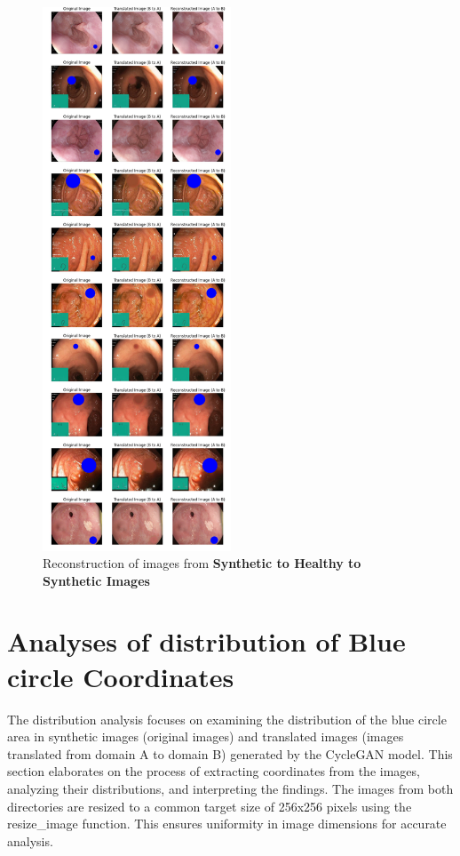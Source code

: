 \documentclass[UKenglish,12pt]{master-style}
\begin{document}
\begin{figure}[htbp]
    \centering
    \includegraphics[width=0.5\textwidth]{Images/B-A-B.jpeg}
    \caption{Reconstruction of images from \textbf{Synthetic to Healthy to Synthetic Images}}
    \label{fig:B-A-B}
\end{figure}

\section{Analyses of distribution of Blue circle Coordinates}

The distribution analysis focuses on examining the distribution of the blue circle area in synthetic images (original images) and translated images (images translated from domain A to domain B) generated by the CycleGAN model. This section elaborates on the process of extracting coordinates from the images, analyzing their distributions, and interpreting the findings. The images from both directories are resized to a common target size of 256x256 pixels using the resize\_image function. This ensures uniformity in image dimensions for accurate analysis.
\end{document}
